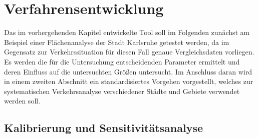 \section{Verfahrensentwicklung}

Das im vorhergehenden Kapitel entwickelte Tool soll im Folgenden zunächst am Beispiel einer Flächenanalyse der Stadt Karlsruhe getestet werden, da im Gegensatz zur Verkehrssituation für diesen Fall genaue Vergleichsdaten vorliegen. Es werden die für die Untersuchung entscheidenden Parameter ermittelt und deren Einfluss auf die untersuchten Größen untersucht. Im Anschluss daran wird in einem zweiten Abschnitt ein standardisiertes Vorgehen vorgestellt, welches zur systematischen Verkehrsanalyse verschiedener Städte und Gebiete verwendet werden soll.\\

\subsection{Kalibrierung und Sensitivitätsanalyse}

